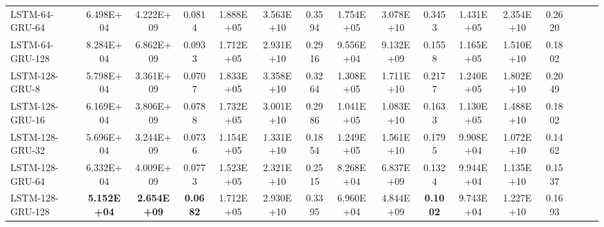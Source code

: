 \begin{landscape}
\begin{longtable}{|l|c|c|c|c|c|c|c|c|c|c|c|c|c|c|c|}
    LSTM-64-GRU-64 & 6.498E+04 & 4.222E+09 & 0.0814 & 1.888E+05 & 3.563E+10 & 0.3594 & 1.754E+05 & 3.078E+10 & 0.3453 & 1.431E+05 & 2.354E+10 & 0.2620 \\
    LSTM-64-GRU-128 & 8.284E+04 & 6.862E+09 & 0.0933 & 1.712E+05 & 2.931E+10 & 0.2916 & 9.556E+04 & 9.132E+09 & 0.1558 & 1.165E+05 & 1.510E+10 & 0.1802 \\
    LSTM-128-GRU-8 & 5.798E+04 & 3.361E+09 & 0.0707 & 1.833E+05 & 3.358E+10 & 0.3264 & 1.308E+05 & 1.711E+10 & 0.2177 & 1.240E+05 & 1.802E+10 & 0.2049 \\
    LSTM-128-GRU-16 & 6.169E+04 & 3.806E+09 & 0.0788 & 1.732E+05 & 3.001E+10 & 0.2986 & 1.041E+05 & 1.083E+10 & 0.1633 & 1.130E+05 & 1.488E+10 & 0.1802 \\
    LSTM-128-GRU-32 & 5.696E+04 & 3.244E+09 & 0.0736 & 1.154E+05 & 1.331E+10 & 0.1854 & 1.249E+05 & 1.561E+10 & 0.1795 & 9.908E+04 & 1.072E+10 & 0.1462 \\
    LSTM-128-GRU-64 & 6.332E+04 & 4.009E+09 & 0.0773 & 1.523E+05 & 2.321E+10 & 0.2515 & 8.268E+04 & 6.837E+09 & 0.1324 & 9.944E+04 & 1.135E+10 & 0.1537 \\
    LSTM-128-GRU-128 & \cellcolor[rgb]{ .573,  .816,  .314}\textbf{5.152E+04} & \cellcolor[rgb]{ .573,  .816,  .314}\textbf{2.654E+09} & \cellcolor[rgb]{ .573,  .816,  .314}\textbf{0.0682} & 1.712E+05 & 2.930E+10 & 0.3395 & 6.960E+04 & 4.844E+09 & \cellcolor[rgb]{ .573,  .816,  .314}\textbf{0.1002} & 9.743E+04 & 1.227E+10 & 0.1693 \\
    \bottomrule
\end{longtable}%
\end{landscape}
